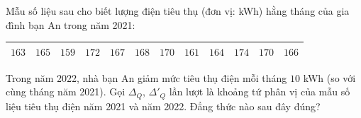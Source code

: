 \begin{ex}
Mẫu số liệu sau cho biết lượng điện tiêu thụ (đơn vị: kWh) hằng tháng của gia đình bạn An trong năm 2021:
\begin{center}
\begin{tabular}{|c|c|c|c|c|c|c|c|c|c|c|c|}\hline
$163$ & $165$ & $159$ & $172$ & $167$ & $168$ & $170$ & $161$ & $164$ & $174$ & $170$ & $166$\\\hline
\end{tabular}
\end{center}
Trong năm 2022, nhà bạn An giảm mức tiêu thụ điện mỗi tháng $10$ kWh (so với cùng tháng năm 2021). Gọi $\Delta_Q$, $\Delta'_Q$ lần lượt là khoảng tứ phân vị của mẫu số liệu tiêu thụ điện năm 2021 và năm 2022. Đẳng thức nào sau đây đúng?
\end{ex}
